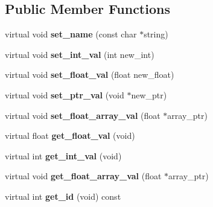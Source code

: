 \subsection*{Public Member Functions}
\begin{DoxyCompactItemize}
\item 
\hypertarget{classGLUI__Control_ac3b3516840d5a736e39f1fd55b6d938b}{virtual void {\bfseries set\-\_\-name} (const char $\ast$string)}\label{classGLUI__Control_ac3b3516840d5a736e39f1fd55b6d938b}

\item 
\hypertarget{classGLUI__Control_a32ef6d11d6c62e344f17268dfb96aad6}{virtual void {\bfseries set\-\_\-int\-\_\-val} (int new\-\_\-int)}\label{classGLUI__Control_a32ef6d11d6c62e344f17268dfb96aad6}

\item 
\hypertarget{classGLUI__Control_a231fe69a978a66b858727e50327bcf59}{virtual void {\bfseries set\-\_\-float\-\_\-val} (float new\-\_\-float)}\label{classGLUI__Control_a231fe69a978a66b858727e50327bcf59}

\item 
\hypertarget{classGLUI__Control_a9c732d42b7d5e418e59c307ef2d98d5c}{virtual void {\bfseries set\-\_\-ptr\-\_\-val} (void $\ast$new\-\_\-ptr)}\label{classGLUI__Control_a9c732d42b7d5e418e59c307ef2d98d5c}

\item 
\hypertarget{classGLUI__Control_a823a5fb2b33f0f45e56efdcd90ff35a0}{virtual void {\bfseries set\-\_\-float\-\_\-array\-\_\-val} (float $\ast$array\-\_\-ptr)}\label{classGLUI__Control_a823a5fb2b33f0f45e56efdcd90ff35a0}

\item 
\hypertarget{classGLUI__Control_a5b4f37b463259dfbf228b34b901a07cc}{virtual float {\bfseries get\-\_\-float\-\_\-val} (void)}\label{classGLUI__Control_a5b4f37b463259dfbf228b34b901a07cc}

\item 
\hypertarget{classGLUI__Control_a3ee80f39e04a26e38bc5e16f0f8af539}{virtual int {\bfseries get\-\_\-int\-\_\-val} (void)}\label{classGLUI__Control_a3ee80f39e04a26e38bc5e16f0f8af539}

\item 
\hypertarget{classGLUI__Control_ae918e20641bc57c690d033f6533d2e29}{virtual void {\bfseries get\-\_\-float\-\_\-array\-\_\-val} (float $\ast$array\-\_\-ptr)}\label{classGLUI__Control_ae918e20641bc57c690d033f6533d2e29}

\item 
\hypertarget{classGLUI__Control_a855a5f2c0267a303b39f685284913b40}{virtual int {\bfseries get\-\_\-id} (void) const }\label{classGLUI__Control_a855a5f2c0267a303b39f685284913b40}


\end{DoxyCompactItemize}

